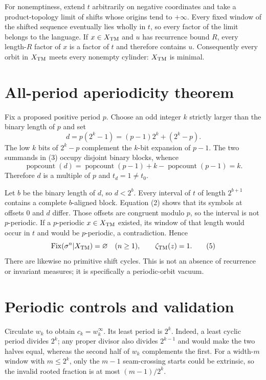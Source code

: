 \documentclass[10pt]{article}
\begin{document}
For nonemptiness, extend $t$ arbitrarily on negative coordinates and take a
product-topology limit of shifts whose origins tend to $+\infty$.  Every fixed
window of the shifted sequence eventually lies wholly in $t$, so every factor
of the limit belongs to the language.  If $x\in X_{\rm TM}$ and $u$ has
recurrence bound $R$, every
length-$R$ factor of $x$ is a factor of $t$ and therefore contains $u$.
Consequently every orbit in $X_{\rm TM}$ meets every nonempty cylinder:
$X_{\rm TM}$ is minimal.

\section{All-period aperiodicity theorem}
Fix a proposed positive period $p$.  Choose an odd integer $k$ strictly larger
than the binary length of $p$ and set
\[
d=p(2^k-1)=(p-1)2^k+(2^k-p).                                    \tag{3}
\]
The low $k$ bits of $2^k-p$ complement the $k$-bit expansion of $p-1$.
The two summands in (3) occupy disjoint binary blocks, whence
\[
\operatorname{popcount}(d)=\operatorname{popcount}(p-1)
+k-\operatorname{popcount}(p-1)=k.                              \tag{4}
\]
Therefore $d$ is a multiple of $p$ and $t_d=1\ne t_0$.

Let $b$ be the binary length of $d$, so $d<2^b$.  Every interval of $t$ of
length $2^{b+1}$ contains a complete $b$-aligned block.  Equation (2) shows
that its symbols at offsets $0$ and $d$ differ.  Those offsets are congruent
modulo $p$, so the interval is not $p$-periodic.  If a $p$-periodic
$x\in X_{\rm TM}$ existed, its window of that length would occur in $t$ and
would be $p$-periodic, a contradiction.  Hence
\begin{equation}
\operatorname{Fix}(\sigma^n|X_{\rm TM})=\varnothing\quad(n\geq1),
\qquad \zeta_{\rm TM}(z)=1.                                    \tag{5}
\end{equation}
There are likewise no primitive shift cycles.  This is not an absence of
recurrence or invariant measures; it is specifically a periodic-orbit vacuum.

\section{Periodic controls and validation}
Circulate $w_k$ to obtain $c_k=w_k^{\infty}$.  Its least period is $2^k$.
Indeed, a least cyclic period divides $2^k$; any proper divisor also divides
$2^{k-1}$ and would make the two halves equal, whereas the second half of
$w_k$ complements the first.  For a width-$m$
window with $m\leq2^k$, only the $m-1$ seam-crossing starts could be extrinsic,
so the invalid rooted fraction is at most $(m-1)/2^k$.
\end{document}
